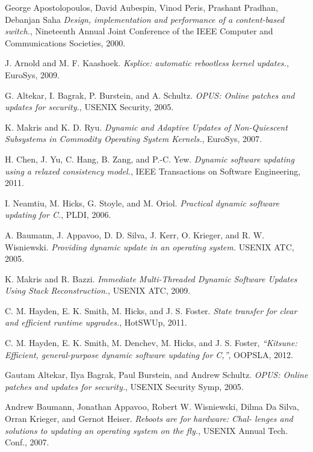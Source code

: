 \documentclass[a4paper,11pt,twoside]{article}
\begin{document}
\begin{thebibliography}{1}
     George Apostolopoulos, David Aubespin, Vinod Peris, Prashant Pradhan, Debanjan Saha {\em Design, implementation and performance of a content-based switch.}, Nineteenth Annual Joint Conference of the IEEE Computer and Communications Societies, 2000.
   
   J. Arnold and M. F. Kaashoek. {\em Ksplice: automatic rebootless kernel updates.}, EuroSys, 2009.
  
    G. Altekar, I. Bagrak, P. Burstein, and A. Schultz. {\em OPUS: Online patches and updates for security.}, USENIX Security, 2005.


   K. Makris and K. D. Ryu. {\em Dynamic and Adaptive Updates of Non-Quiescent Subsystems in Commodity Operating System Kernels.}, EuroSys, 2007. 
  
   H. Chen, J. Yu, C. Hang, B. Zang, and P.-C. Yew. {\em Dynamic software updating using a relaxed consistency model.}, IEEE Transactions on Software Engineering, 2011.

   I. Neamtiu, M. Hicks, G. Stoyle, and M. Oriol. {\em Practical dynamic software updating for C.}, PLDI, 2006.
  
   A. Baumann, J. Appavoo, D. D. Silva, J. Kerr, O. Krieger, and R. W. Wisniewski. {\em Providing dynamic update in an operating system.} USENIX ATC, 2005. 

   K. Makris and R. Bazzi. {\em Immediate Multi-Threaded Dynamic Software Updates Using Stack Reconstruction.}, USENIX ATC, 2009.

  C. M. Hayden, E. K. Smith, M. Hicks, and J. S. Foster. {\em State transfer for clear and efficient runtime upgrades.}, HotSWUp, 2011.
 
   C. M. Hayden, E. K. Smith, M. Denchev, M. Hicks, and J. S. Foster, {\em “Kitsune: Efficient, general-purpose dynamic software updating for C,”}, OOPSLA, 2012.
  
   Gautam Altekar, Ilya Bagrak, Paul Burstein, and Andrew Schultz. {\em OPUS: Online patches and updates for security.}, USENIX Security Symp, 2005. 

   Andrew Baumann, Jonathan Appavoo, Robert W. Wisniewski, Dilma Da Silva, Orran Krieger, and Gernot Heiser. {\em Reboots are for hardware: Chal- lenges and solutions to updating an operating system on the fly.}, USENIX Annual Tech. Conf., 2007. 
  

\end{thebibliography}
\end{document}
